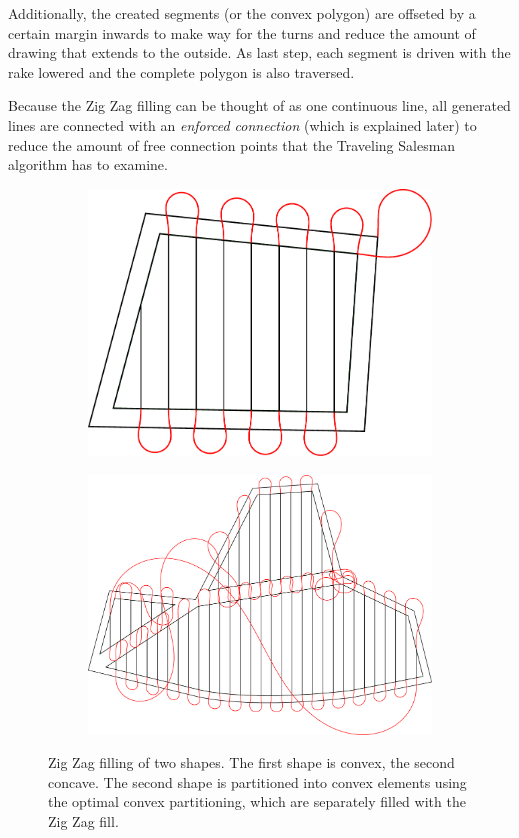 Additionally, the created segments (or the convex polygon) are offseted by a certain margin inwards to make way for the turns and reduce the amount of drawing that extends to the outside. As last step, each segment is driven with the rake lowered and the complete polygon is also traversed.

Because the Zig Zag filling can be thought of as one continuous line, all generated lines are connected with an \textit{enforced connection} (which is explained later) to reduce the amount of free connection points that the Traveling Salesman algorithm has to examine.
\begin{figure}
\centering
\begin{subfigure}[b]{0.6\textwidth}
\includegraphics[width=\textwidth]{images/path_planning/zigzag_1.pdf}
\end{subfigure}
\par\bigskip
\begin{subfigure}[b]{0.9\textwidth}
\includegraphics[width=\textwidth]{images/path_planning/zigzag_2.pdf}
\end{subfigure}
\caption{Zig Zag filling of two shapes. The first shape is convex, the second concave. The second shape is partitioned into convex elements using the optimal convex partitioning, which are separately filled with the Zig Zag fill.}
\end{figure}

